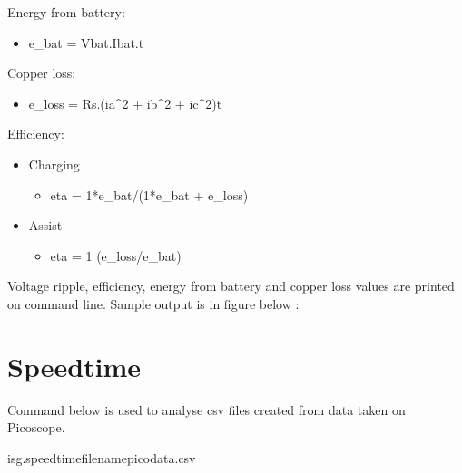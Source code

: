 \documentclass[letterpaper,10pt,english]{sphinxmanual}
\begin{document}
\sphinxAtStartPar
Energy from battery:
\begin{itemize}
\item {} 
\sphinxAtStartPar
e\_bat = Vbat.Ibat.t

\end{itemize}

\sphinxAtStartPar
Copper loss:
\begin{itemize}
\item {} 
\sphinxAtStartPar
e\_loss = Rs.(ia\textasciicircum{}2 + ib\textasciicircum{}2 + ic\textasciicircum{}2)t

\end{itemize}

\sphinxAtStartPar
Efficiency:
\begin{itemize}
\item {} 
\sphinxAtStartPar
Charging\sphinxhyphen{}
\begin{itemize}
\item {} 
\sphinxAtStartPar
eta = \sphinxhyphen{}1*e\_bat/(\sphinxhyphen{}1*e\_bat + e\_loss)

\end{itemize}

\item {} 
\sphinxAtStartPar
Assist\sphinxhyphen{}
\begin{itemize}
\item {} 
\sphinxAtStartPar
eta = 1 \sphinxhyphen{} (e\_loss/e\_bat)

\end{itemize}

\end{itemize}

\sphinxAtStartPar
Voltage ripple, efficiency, energy from battery and copper loss values are printed on command line.
Sample output is in figure below :

\noindent{}

\sphinxstepscope


\chapter{Speedtime}
\label{\detokenize{speedtime:speedtime}}\label{\detokenize{speedtime::doc}}
\sphinxAtStartPar
Command below is used to analyse csv files created from data taken on Picoscope.
\def\sphinxLiteralBlockLabel{\label{\detokenize{speedtime:id1}}}
\begin{sphinxVerbatim}[commandchars=\\\{\}]
isg.speedtime\PYGZhy{}\PYGZhy{}file\PYGZus{}namepicodata.csv
\end{sphinxVerbatim}
\end{document}
